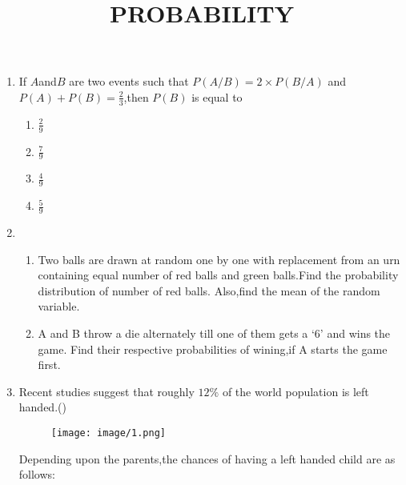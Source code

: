 \documentclass[12pt]{article}
\begin{document}
\title{\textbf{PROBABILITY}}
\date{}
\maketitle
\begin{enumerate}
    \item If $A$and$B$ are two events such that $P(A/B)=2 \times P(B/A)$ and $P(A)+P(B)=\frac{2}{3}$,then $P(B)$ is equal to
    \begin{enumerate}
        \item $\frac{2}{9}$
        \item $\frac{7}{9}$
        \item $\frac{4}{9}$
        \item $\frac{5}{9}$
    \end{enumerate}
    \item
    \begin{enumerate}
        \item Two balls are drawn at random one by one with replacement from an urn containing equal number of red balls and green balls.Find the probability distribution of number of red balls. Also,find the mean of the random variable.
        \item A and B throw a die alternately till one of them gets a `6' and wins the game. Find their respective probabilities of wining,if A starts the game first.
    \end{enumerate}
   \item Recent studies suggest that roughly $12\%$ of the world population is left handed.()\\
\begin{figure}[H]
       \centering
       \texttt{[image: image/1.png]}
       \caption{}
       \label{fig:fig1}
\end{figure}
   Depending upon the parents,the chances of having a left handed child are as follows:\\
   

\end{enumerate}
\end{document}
